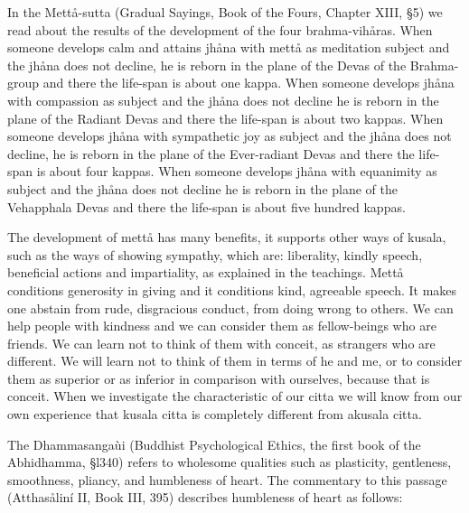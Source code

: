 \documentclass[12pt,twoside]{article}
\begin{document}
In the
{\textasciigrave}{\textasciigrave}Mett{\aa}{}-sutta{\textquotesingle}{\textquotesingle}
(Gradual Sayings, Book of the Fours, Chapter XIII, {\S}5) we read about
the results of the development of the four brahma{}-vih{\aa}ras. When
someone develops calm and attains jh{\aa}na with mett{\aa} as
meditation subject and the jh{\aa}na does not decline, he is reborn in
the plane of the {\textasciigrave}{\textasciigrave}Devas of the
Brahma{}-group{\textquotesingle}{\textquotesingle} and there the
life{}-span is about one kappa. When someone develops jh{\aa}na with
compassion as subject and the jh{\aa}na does not decline he is reborn
in the plane of the {\textasciigrave}{\textasciigrave}Radiant
Devas{\textquotesingle}{\textquotesingle} and there the life{}-span is
about two kappas. When someone develops jh{\aa}na with sympathetic joy
as subject and the jh{\aa}na does not decline, he is reborn in the
plane of the {\textasciigrave}{\textasciigrave}Ever{}-radiant
Devas{\textquotesingle}{\textquotesingle} and there the life{}-span is
about four kappas. When someone develops jh{\aa}na with equanimity as
subject and the jh{\aa}na does not decline he is reborn in the plane of
the {\textasciigrave}{\textasciigrave}Vehapphala
Devas{\textquotesingle}{\textquotesingle} and there the life{}-span is
about five hundred kappas. 

The development of mett{\aa} has many benefits, it supports other ways
of kusala, such as the {\textasciigrave}{\textasciigrave}ways of
showing sympathy{\textquotesingle}{\textquotesingle}, which are:
liberality, kindly speech, beneficial actions and impartiality, as
explained in the teachings. Mett{\aa} conditions generosity in giving
and it conditions kind, agreeable speech. It makes one abstain from
rude, disgracious conduct, from doing wrong to others. We can help
people with kindness and we can consider them as fellow{}-beings who
are friends. We can learn not to think of them with conceit, as
strangers who are different. We will learn not to think of them in
terms of
{\textasciigrave}{\textasciigrave}he{\textquotesingle}{\textquotesingle}
and
{\textasciigrave}{\textasciigrave}me{\textquotesingle}{\textquotesingle},
or to consider them as superior or as inferior in comparison with
ourselves, because that is conceit. When we investigate the
characteristic of our citta we will know from our own experience that
kusala citta is completely different from akusala citta. 

The Dhammasanga\`ui (Buddhist Psychological Ethics, the first book of
the Abhidhamma, {\S}l340) refers to wholesome qualities such as
plasticity, gentleness, smoothness, pliancy, and humbleness of heart.
The commentary to this passage (Atthas{\aa}lin\'i II, Book III, 395)
describes humbleness of heart as follows:
\end{document}
